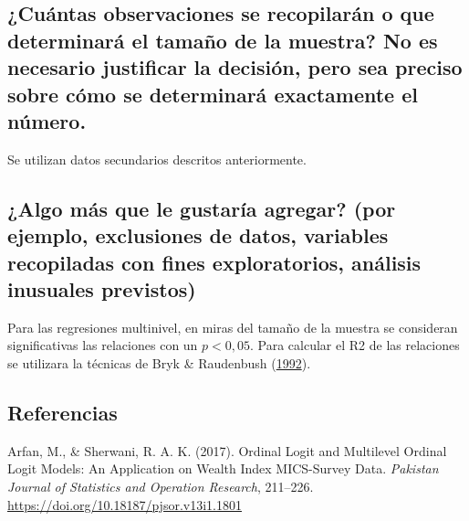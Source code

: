 \documentclass[
  12pt,
]{article}
\begin{document}
\hypertarget{cuuxe1ntas-observaciones-se-recopilaruxe1n-o-que-determinaruxe1-el-tamauxf1o-de-la-muestra-no-es-necesario-justificar-la-decisiuxf3n-pero-sea-preciso-sobre-cuxf3mo-se-determinaruxe1-exactamente-el-nuxfamero.}{%
\subsection{¿Cuántas observaciones se recopilarán o que determinará el
tamaño de la muestra? No es necesario justificar la decisión, pero sea
preciso sobre cómo se determinará exactamente el
número.}\label{cuuxe1ntas-observaciones-se-recopilaruxe1n-o-que-determinaruxe1-el-tamauxf1o-de-la-muestra-no-es-necesario-justificar-la-decisiuxf3n-pero-sea-preciso-sobre-cuxf3mo-se-determinaruxe1-exactamente-el-nuxfamero.}}

Se utilizan datos secundarios descritos anteriormente.

\hypertarget{algo-muxe1s-que-le-gustaruxeda-agregar-por-ejemplo-exclusiones-de-datos-variables-recopiladas-con-fines-exploratorios-anuxe1lisis-inusuales-previstos}{%
\subsection{¿Algo más que le gustaría agregar? (por ejemplo, exclusiones
de datos, variables recopiladas con fines exploratorios, análisis
inusuales
previstos)}\label{algo-muxe1s-que-le-gustaruxeda-agregar-por-ejemplo-exclusiones-de-datos-variables-recopiladas-con-fines-exploratorios-anuxe1lisis-inusuales-previstos}}

Para las regresiones multinivel, en miras del tamaño de la muestra se
consideran significativas las relaciones con un \(p< 0,05\). Para
calcular el R2 de las relaciones se utilizara la técnicas de Bryk \&
Raudenbush (\protect\hyperlink{ref-bryk_Hierarchical_1992}{1992}).

\pagebreak

\hypertarget{referencias}{%
\subsection*{Referencias}\label{referencias}}

\hypertarget{refs}{}
\leavevmode\hypertarget{ref-arfan_Ordinal_2017}{}%
Arfan, M., \& Sherwani, R. A. K. (2017). Ordinal Logit and Multilevel
Ordinal Logit Models: An Application on Wealth Index MICS-Survey Data.
\emph{Pakistan Journal of Statistics and Operation Research}, 211--226.
\url{https://doi.org/10.18187/pjsor.v13i1.1801}
\end{document}
